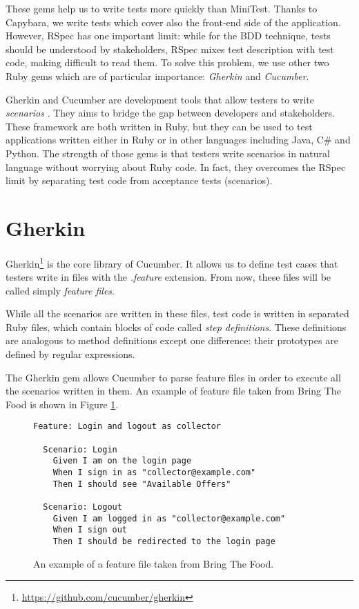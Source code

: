 These gems help us to write tests more quickly than MiniTest. Thanks to Capybara, we write tests which cover also the front-end side of the application. 
However, RSpec has one important limit: while for the BDD technique, tests should be understood by stakeholders, RSpec mixes test description with test code, making difficult to read them. To solve this problem, we use other two Ruby gems which are of particular importance: \textit{Gherkin} and \textit{Cucumber}.

Gherkin and Cucumber are development tools that allow testers to write \textit{scenarios} \cite{book:cucumber}. They aims to bridge the gap between developers and stakeholders. These framework are both written in Ruby, but they can be used to test applications written either in Ruby or in other languages including Java, C\# and Python. The strength of those gems is that testers write scenarios in natural language without worrying about Ruby code. In fact, they overcomes the RSpec limit by separating test code from acceptance tests (scenarios).

\section{Gherkin}

Gherkin\footnote{\url{https://github.com/cucumber/gherkin}} is the core library of Cucumber. It allows us to define test cases that testers write in files with the \textit{.feature} extension. From now, these files will be called simply \textit{feature files}.

While all the scenarios are written in these files, test code is written in separated Ruby files, which contain blocks of code called \textit{step definitions}. These definitions are analogous to method definitions except one difference: their prototypes are defined by regular expressions.

The Gherkin gem allows Cucumber to parse feature files in order to execute all the scenarios written in them. An example of feature file taken from Bring The Food is shown in Figure \ref{figure:scenario_example_original}.

\begin{figure}[h!]
\begin{verbatim}
Feature: Login and logout as collector

  Scenario: Login
    Given I am on the login page
    When I sign in as "collector@example.com"
    Then I should see "Available Offers"

  Scenario: Logout
    Given I am logged in as "collector@example.com"
    When I sign out
    Then I should be redirected to the login page
\end{verbatim}
\vspace{-1em}
\caption{An example of a feature file taken from Bring The Food.}
\label{figure:scenario_example_original}
\end{figure}

